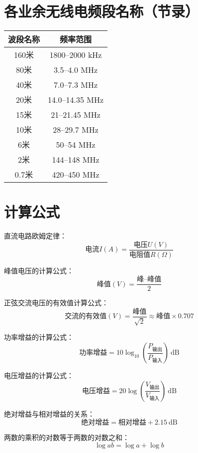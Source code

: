 \newpage






\section{各业余无线电频段名称（节录）}


\begin{longtable}{|c|c|}
	\hline
	\textbf{波段名称} & \textbf{频率范围} \\
	\hline
	160米 & 1800–2000 kHz \\
	\hline
	80米 & 3.5–4.0 MHz \\
	\hline
	40米 & 7.0–7.3 MHz \\
	\hline
	20米 & 14.0–14.35 MHz \\
	\hline
	15米 & 21–21.45 MHz \\
	\hline
	10米 & 28–29.7 MHz \\
	\hline
	6米 & 50–54 MHz \\
	\hline
	2米 & 144–148 MHz \\
	\hline
	0.7米 & 420–450 MHz \\
	\hline
\end{longtable}

\newpage

\section{计算公式}

直流电路欧姆定律：
$$\mbox{电流}I(A)=\frac{\mbox{电压}U(V)}{\mbox{电阻值}R(\Omega)}$$

峰值电压的计算公式：
$$\mbox{峰值}(V)=\frac{\mbox{峰--峰值}}{2}$$

正弦交流电压的有效值计算公式：
$$\mbox{交流的有效值}(V)=\frac{\mbox{峰值}}{\sqrt{2}} \approx \mbox{峰值}\times0.707$$

功率增益的计算公式：
$$\mbox{功率增益}=10 \log_{10} \left( {\frac{P_{ \mbox{输出} }}{P_{ \mbox{输入} }}}\right)\ \mathrm{dB}$$

电压增益的计算公式：
$$\mbox{电压增益}=20 \log \left( {\frac{V_{ \mbox{输出} }}{V_{ \mbox{输入} }}} \right)\ \mathrm{dB}$$


绝对增益与相对增益的关系：
$$\mbox{绝对增益} = \mbox{相对增益} + 2.15 \ \mathrm{dB}$$

两数的乘积的对数等于两数的对数之和：
$$\log ab=\log a+\log b$$

